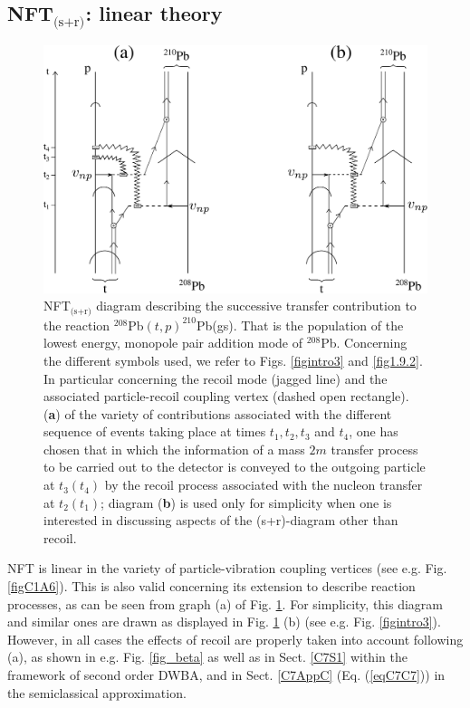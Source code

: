 \begin{subappendices}
\section{NFT$_{\text{(s+r)}}$: linear theory}\label{App1C3}
\begin{figure}
\centerline {
\includegraphics*[width=15cm]{introduccion/figs/fig1_C_2}
}
\caption{NFT$_{\text{(s+r)}}$ diagram describing the successive transfer contribution to the reaction $^{208}$Pb$(t,p)^{210}$Pb(gs). That is the population of the lowest energy, monopole pair addition mode of $^{208}$Pb. Concerning the different symbols used, we refer to Figs. \ref{figintro3} and \ref{fig1.9.2}. In particular concerning the recoil mode (jagged line) and the associated particle-recoil  coupling vertex (dashed open rectangle). (\textbf{a}) of the variety of contributions associated with the different sequence of events taking place  at times $t_1,t_2,t_3$ and $t_4$, one has chosen that in which the information of a mass $2m$ transfer process to be carried out to the detector is conveyed to the outgoing particle at $t_3(t_4)$ by the recoil process associated with the nucleon transfer at $t_2(t_1)$; diagram (\textbf{b}) is used only for simplicity when one is interested in discussing aspects of the (s+r)-diagram other than recoil.}
\label{fig1.C.2}
\end{figure}
NFT is linear in the variety of particle-vibration coupling vertices (see e.g. Fig. \ref{figC1A6}).  This is also valid concerning its extension to describe reaction processes, as can be seen from graph (a) of Fig. \ref{fig1.C.2}. For simplicity, this diagram and similar ones are drawn as displayed in Fig. \ref{fig1.C.2} (b) (see e.g. Fig. \ref{figintro3}). However, in all cases the effects of recoil are properly taken into account following (a), as shown in e.g. Fig. \ref{fig_beta} as well as in Sect. \ref{C7S1} within the framework of second order DWBA, and in Sect. \ref{C7AppC} (Eq. (\ref{eqC7C7})) in the semiclassical approximation.

\end{subappendices}
